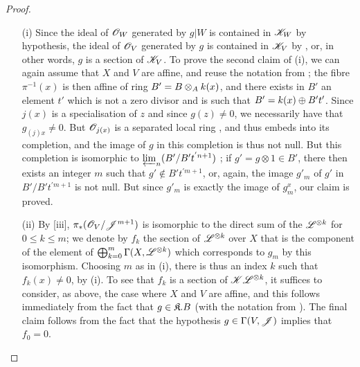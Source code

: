 \begin{proof}
\label{proof-2.8.10.5}
\begin{enumerate}
    \item[\rm{(i)}] Since the ideal of $\mathscr{O}_W$ generated by $g|W$ is contained in $\mathscr{K}_W$ by hypothesis, the ideal of $\mathscr{O}_V$ generated by $g$ is contained in $\mathscr{K}_V$ by , or, in other words, $g$ is a section of $\mathscr{K}_V$.
        To prove the second claim of (i), we can again assume that $X$ and $V$ are affine, and reuse the notation from ;
        the fibre $\pi^{-1}(x)$ is then affine of ring $B'=B\otimes_Ak(x)$, and there exists in $B'$ an element $t'$ which is not a zero divisor and is such that $B'=k(x)\oplus B't'$.
        Since $j(x)$ is a specialisation of $z$ and since $g(z)\neq0$, we necessarily have that $g_{(j)x}\neq0$.
        But $\mathscr{O}_{j(x)}$ is a separated local ring , and thus embeds into its completion, and the image of $g$ in this completion is thus not null.
        But this completion is isomorphic to $\varprojlim_n(B'/B't^{'n+1})$ ;
        if $g'=g\otimes1\in B'$, there then exists an integer $m$ such that $g'\not\in B't^{'m+1}$, or, again, the image $g'_m$ of $g'$ in $B'/B't^{'m+1}$ is not null.
        But since $g'_m$ is exactly the image of $g_m^x$, our claim is proved.
    \item[\rm{(ii)}] By [iii], $\pi_*(\mathscr{O}_V/\mathscr{J}^{m+1})$ is isomorphic to the direct sum of the $\mathscr{L}^{\otimes k}$ for $0\leq k\leq m$;
        we denote by $f_k$ the section of $\mathscr{L}^{\otimes k}$ over $X$ that is the component of the element of $\bigoplus_{k=0}^m\Gamma(X,\mathscr{L}^{\otimes k})$ which corresponds to $g_m$ by this isomorphism.
        Choosing $m$ as in (i), there is thus an index $k$ such that $f_k(x)\neq0$, by (i).
        To see that $f_k$ is a section of $\mathscr{K}\mathscr{L}^{\otimes k}$, it suffices to consider, as above, the case where $X$ and $V$ are affine, and this follows immediately from the fact that $g\in\mathfrak{K}.B$ (with the notation from ).
        The final claim follows from the fact that the hypothesis $g\in\Gamma(V,\mathscr{J})$ implies that $f_0=0$.
\end{enumerate}
\end{proof}

